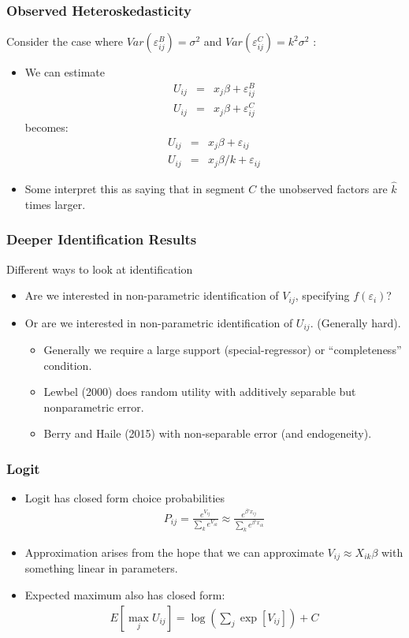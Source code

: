\documentclass[xcolor=pdftex,dvipsnames,table,mathserif]{beamer}
\begin{document}
\begin{frame}
\frametitle{Observed Heteroskedasticity}
Consider the case where $Var(\varepsilon_{ij}^B) = \sigma^2$ and   $Var(\varepsilon_{ij}^C) =  k^2 \sigma^2$ :
\begin{itemize}
\item We can estimate
\begin{eqnarray*}
U_{ij} &=& x_j \beta + \varepsilon_{ij}^B\\
U_{ij} &=& x_j \beta + \varepsilon_{ij}^C
\end{eqnarray*}
becomes:
\begin{eqnarray*}
U_{ij} &=& x_j \beta + \varepsilon_{ij}\\
U_{ij} &=& x_j \beta/k+ \varepsilon_{ij}
\end{eqnarray*}
\item Some interpret this as saying that in segment $C$ the unobserved factors are $\hat{k}$ times larger.
\end{itemize}
\end{frame}

\begin{frame}
\frametitle{Deeper Identification Results}
Different ways to look at identification
\begin{itemize}
\item Are we interested in non-parametric identification of $V_{ij}$, specifying $f(\varepsilon_i)$?
\item Or are we interested in non-parametric identification of $U_{ij}$. (Generally hard).
\begin{itemize}
\item Generally we require a large support (special-regressor) or ``completeness'' condition.
\item Lewbel (2000) does random utility with additively separable but nonparametric error.\item Berry and Haile (2015) with non-separable error (and endogeneity).
\end{itemize}
\end{itemize}
\end{frame}


\begin{frame}
\frametitle{Logit}
\begin{itemize}
\item Logit has closed form choice probabilities
\begin{eqnarray*}
P_{ij} = \frac{e^{V_{ij}}}{\sum_k e^{V_{ik}}} \approx \frac{e^{\beta' x_{ij}}}{\sum_k e^{\beta' x_{ik}}}
\end{eqnarray*}
\item Approximation arises from the hope that we can approximate $V_{ij} \approx  X_{ik} \beta$ with something linear in parameters.
\item Expected maximum also has closed form:
\begin{eqnarray*}
E[\max_j U_{ij}] = \log \left(\sum_j \exp[V_{ij}] \right) + C
\end{eqnarray*}
\end{itemize}
\end{frame}
\end{document}
